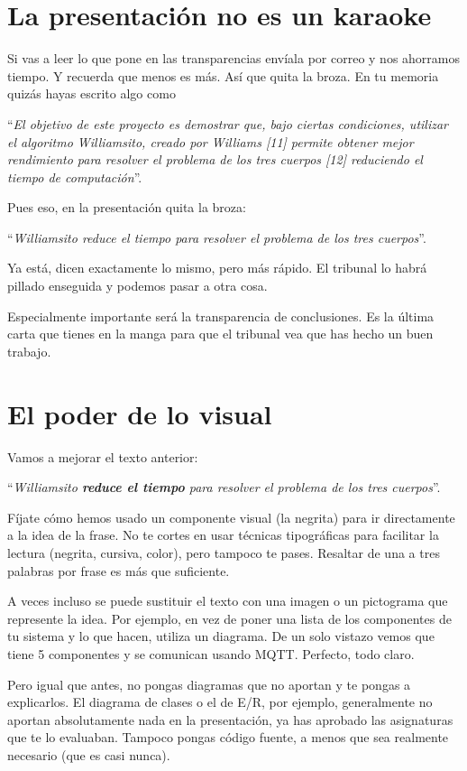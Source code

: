 \section{La presentación no es un karaoke}

Si vas a leer lo que pone en las transparencias envíala por correo y nos ahorramos tiempo. Y recuerda que menos es más. Así que quita la broza. En tu memoria quizás hayas escrito algo como 

``\textit{El objetivo de este proyecto es demostrar que, bajo ciertas condiciones, utilizar el algoritmo Williamsito, creado por Williams [11] permite obtener mejor rendimiento para resolver el problema de los tres cuerpos [12] reduciendo el tiempo de computación}''. 

Pues eso, en la presentación quita la broza: 

``\textit{Williamsito reduce el tiempo para resolver el problema de los tres cuerpos}''. 

Ya está, dicen exactamente lo mismo, pero más rápido. El tribunal lo habrá pillado enseguida y podemos pasar a otra cosa.

Especialmente importante será la transparencia de conclusiones. Es la última carta que tienes en la manga para que el tribunal vea que has hecho un buen trabajo.

\section{El poder de lo visual}
Vamos a mejorar el texto anterior: 

``\textit{Williamsito \textbf{reduce el tiempo} para resolver el problema de los tres cuerpos}''. 

Fíjate cómo hemos usado un componente visual (la negrita) para ir directamente a la idea de la frase. No te cortes en usar técnicas tipográficas para facilitar la lectura (negrita, cursiva, color), pero tampoco te pases. Resaltar de una a tres palabras por frase es más que suficiente.

A veces incluso se puede sustituir el texto con una imagen o un pictograma que represente la idea. Por ejemplo, en vez de poner una lista de los componentes de tu sistema y lo que hacen, utiliza un diagrama. De un solo vistazo vemos que tiene 5 componentes y se comunican usando MQTT. Perfecto, todo claro. 

Pero igual que antes, no pongas diagramas que no aportan y te pongas a explicarlos. El diagrama de clases o el de E/R, por ejemplo, generalmente no aportan absolutamente nada en la presentación, ya has aprobado las asignaturas que te lo evaluaban. Tampoco pongas código fuente, a menos que sea realmente necesario (que es casi nunca).

